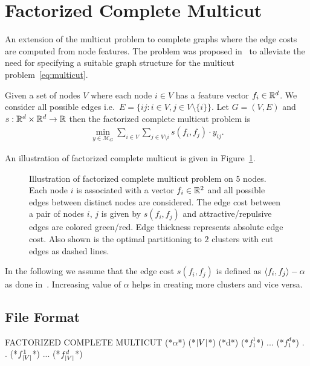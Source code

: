 \section{Factorized Complete Multicut}
\label{sec:complete_multicut}
An extension of the multicut problem to complete graphs where the edge costs are computed from node features. The problem was proposed in~\cite{aabbas23_clusterfug} to alleviate the need for specifying a suitable graph structure for the multicut problem~\eqref{eq:multicut}. 
\begin{definition}
    Given a set of nodes $V$ where each node $i \in V$ has a feature vector $f_i \in \mathbb{R}^d$. We consider all possible edges i.e.\ $E = \{ij : i \in V, j \in V\setminus \{i\} \}$. 
    Let $G = (V, E)$ and $s: \mathbb{R}^d \times \mathbb{R}^d \rightarrow \mathbb{R}$ then the factorized complete multicut problem is
    \begin{equation}
        \label{eq:factorized_complete_multicut}
        \begin{array}{rl}
            \min_{y \in \mathcal{M}_G} \sum\limits_{i \in V} \sum\limits_{j \in V \setminus i} s(f_i, f_j) \cdot y_{ij}.
        \end{array}
    \end{equation}
\end{definition}

An illustration of factorized complete multicut is given in Figure~\ref{fig:factorized-complete-multicut}.

\begin{figure}[H]
    \begin{center}
    \scalebox{1.5}{}
    \end{center}
    \caption{Illustration of factorized complete multicut problem on $5$ nodes. Each node $i$ is associated with a vector $f_i \in \mathbb{R}^2$ and all possible edges between distinct nodes are considered. The edge cost between a pair of nodes $i$, $j$ is given by $s(f_i, f_j)$ and attractive/repulsive edges are colored green/red. Edge thickness represents absolute edge cost. Also shown is the optimal partitioning to $2$ clusters with cut edges as dashed lines.}    
    \label{fig:factorized-complete-multicut}
\end{figure}
In the following we assume that the edge cost $s(f_i, f_j)$ is defined as $\langle f_i, f_j \rangle - \alpha$ as done in~\cite{aabbas23_clusterfug}. Increasing value of $\alpha$ helps in creating more clusters and vice versa.
\subsection{File Format}
\begin{fileformat}[innertopmargin=7,innerbottommargin=10]
FACTORIZED COMPLETE MULTICUT
(*$\alpha$*)
(*$\lvert V\rvert$*) (*d*)
(*$f_1^1$*) ... (*$f_1^d$*)
.
.
(*$f_{\lvert V\rvert}^1$*) ... (*$f_{\lvert V\rvert}^d$*)
\end{fileformat}

